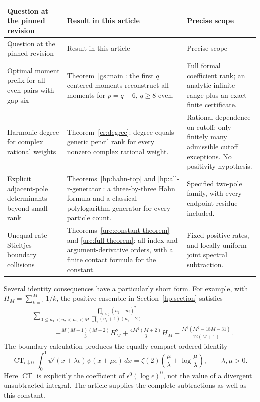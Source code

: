 \begin{longtable}{@{}>{\raggedright\arraybackslash}p{}
 >{\raggedright\arraybackslash}p{}
 >{\raggedright\arraybackslash}p{}@{}}
\toprule
Question at the pinned revision & Result in this article & Precise scope\\
\midrule
\endfirsthead
\toprule
Question at the pinned revision & Result in this article & Precise scope\\
\midrule
\endhead
Optimal moment prefix for all even pairs with gap six &
Theorem~\ref{gs:main}: the first $q$ centered moments reconstruct
all moments for $p=q-6$, $q\ge8$ even. &
Full formal coefficient rank; an analytic infinite range plus an
exact finite certificate.\\[7pt]
Harmonic degree for complex rational weights &
Theorem~\ref{cr:degree}: degree equals generic pencil rank for
every nonzero complex rational weight. &
Rational dependence on cutoff; only finitely many admissible
cutoff exceptions. No positivity hypothesis.\\[7pt]
Explicit adjacent-pole determinants beyond small rank &
Theorems~\ref{hp:hahn-top} and \ref{hp:all-r-generator}: a
three-by-three Hahn formula and a classical-polylogarithm
generator for every particle count. &
Specified two-pole family, with every endpoint residue included.\\[7pt]
Unequal-rate Stieltjes boundary collisions &
Theorems~\ref{urc:constant-theorem} and \ref{urc:full-theorem}:
all index and argument-derivative orders, with a finite contact
formula for the constant. &
Fixed positive rates, and locally uniform joint spectral
subtraction.\\
\bottomrule
\end{longtable}

Several identity consequences have a particularly short form.
For example, with $H_M=\sum_{k=1}^M1/k$, the positive ensemble
in Section~\ref{hp:section} satisfies
\[\begin{aligned}
 &\sum_{0\le n_1<n_2<n_3<M}
 \frac{\prod_{i<j}(n_j-n_i)^2}{\prod_i(n_i+1)(n_i+2)}\\
 &\qquad=
 -\frac{M(M+1)(M+2)}3H_M^2+
 \frac{4M^2(M+2)}3H_M+
 \frac{M^3(M^2-18M-31)}{12(M+1)}.
\end{aligned}\]
The boundary calculation produces the equally compact ordered
identity
\[
 \operatorname{CT}_{\epsilon\downarrow0}
 \int_0^1\psi'(x+\lambda\epsilon)\psi(x+\mu\epsilon)\,dx
 =\zeta(2)\left(\frac\mu\lambda+\log\frac\mu\lambda\right),
 \qquad\lambda,\mu>0.
\]
Here $\operatorname{CT}$ is explicitly the coefficient of
$\epsilon^0(\log\epsilon)^0$, not the value of a divergent
unsubtracted integral. The article supplies the complete
subtractions as well as this constant.


